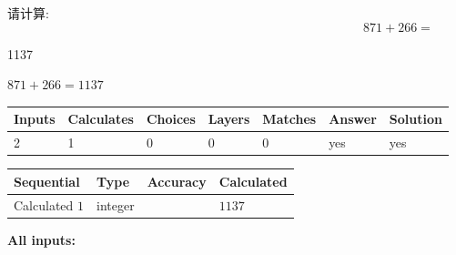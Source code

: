 \documentclass{ctexart}
\begin{document}
  
 
请计算:
\begin{equation}
871 +  %
266 = \nonumber
\end{equation}
 
 
 
\noindent{}
 
 

1137
 
 
\noindent{}
 
 

 
 
 
\noindent{}
 
 

$ %
871 +  %
266=   %
1137$
 
 
\noindent{}
 
 

 
   
   
   
   
\noindent\begin{tabular}{|l|l|l|l|l|l|l|}
 \hline
Inputs & Calculates & Choices & Layers & Matches & Answer & Solution \\ \hline
 2  & 
 1  & 
 0
  & 
 0  & 
 0  & 
  yes & 
  yes 
  \\ \hline
 \end{tabular}
   
   
   
   
\noindent{}
   
   
  
  
\noindent\begin{tabular}{|l|l|l|l|}
\hline
 Sequential & Type & Accuracy & Calculated \\ 
\hline
 
 
  Calculated $  1 $ & integer &  & 
  $ 1137 $ 
 \\  \hline  
 \end{tabular}
   
   
   
   
\noindent\vspace{0.1in}\hspace{-0.08in} {\textbf{\Large{All inputs: }}}
   
\end{document}
